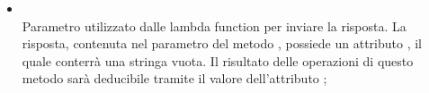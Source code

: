 \begin{itemize}
\begin{itemize}
\begin{itemize}
Tali dati sono:
\begin{lstlisting}[language=json,firstnumber=1]
{
    "msg":"NotificationMessage",
    "send\_to":"String"
}
\end{lstlisting}
Dove  è un oggetto di tipo , mentre  è una stringa contenente il mittente del messaggio;
			\item {} \\
			Parametro utilizzato dalle lambda function per inviare la risposta. La risposta, contenuta nel  parametro del metodo , possiede un attributo , il quale conterrà una stringa vuota. Il risultato delle operazioni di questo metodo sarà deducibile tramite il valore dell'attributo ;
		\end{itemize}
	\end{itemize}
\end{itemize}

